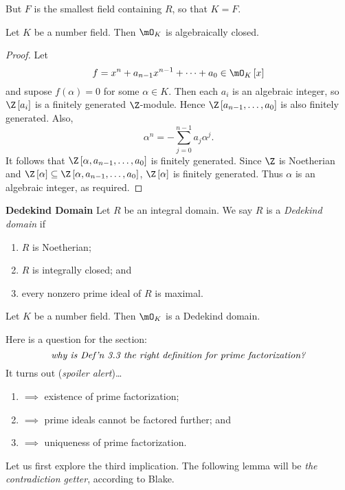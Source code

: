 \documentclass[pmath441]{subfiles}
\begin{document}
    But $F$ is the smallest field containing $R$, so that $K=F$.

    \begin{prop}{}
        Let $K$ be a number field. Then $\mO_K$ is algebraically closed.
    \end{prop}
    
    \begin{proof}
        Let
        \begin{equation*}
            f = x^n+a_{n-1}x^{n-1}+\cdots+a_0\in\mO_K\left[ x \right]
        \end{equation*}
        and supose $f\left( \alpha \right) = 0$ for some $\alpha\in K$. Then each $a_i$ is an algebraic integer, so $\Z\left[ a_i \right]$ is a finitely generated $\Z$-module. Hence $\Z\left[ a_{n-1},\ldots,a_0 \right]$ is also finitely generated. Also,
        \begin{equation*}
            \alpha^n = -\sum^{n-1}_{j=0} a_j\alpha^j.
        \end{equation*}
        It follows that $\Z\left[ \alpha,a_{n-1},\ldots,a_0 \right]$ is finitely generated. Since $\Z$ is Noetherian and $\Z\left[ \alpha \right]\subseteq\Z\left[ \alpha,a_{n-1},\ldots,a_0 \right]$, $\Z\left[ \alpha \right]$ is finitely generated. Thus $\alpha$ is an algebraic integer, as required.
    \end{proof}
    
    \begin{definition}{\textbf{Dedekind Domain}}
        Let $R$ be an integral domain. We say $R$ is a \emph{Dedekind domain} if
        \begin{enumerate}
            \item $R$ is Noetherian;
            \item $R$ is integrally closed; and
            \item every nonzero prime ideal of $R$ is maximal.
        \end{enumerate}
    \end{definition}
    
    \begin{example}{}
        Let $K$ be a number field. Then $\mO_K$ is a Dedekind domain.
    \end{example}

    \rruleline

    \clearpage
    
    \np Here is a question for the section:
    \begin{equation*}
        \text{\textit{why is Def'n 3.3 the right definition for prime factorization?}}
    \end{equation*}
    It turns out (\textit{spoiler alert})\ldots
    \begin{enumerate}
        \item $\implies$ existence of prime factorization;
        \item $\implies$ prime ideals cannot be factored further; and
        \item $\implies$ uniqueness of prime factorization.
    \end{enumerate}
    Let us first explore the third implication. The following lemma will be \textit{the contradiction getter}, according to Blake.
\end{document}
